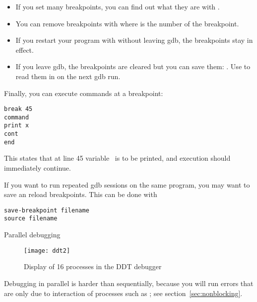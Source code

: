 \begin{itemize}
\item If you set many breakpoints, you can find out what they are with
  . 
\item You can remove breakpoints with  where  is the
  number of the breakpoint.
\item If you restart your program with  without leaving gdb,
  the breakpoints stay in effect.
\item If you leave gdb, the breakpoints are cleared but you can save
  them: . Use  to read
  them in on the next gdb run.
\end{itemize}

Finally, you can execute commands at a breakpoint:
\begin{verbatim}
break 45
command
print x
cont
end
\end{verbatim}
This states that at line 45 variable~ is to be printed, and execution
should immediately continue.

If you want to run repeated gdb sessions on the same program,
you may want to save an reload breakpoints. This can be done with
\begin{verbatim}
save-breakpoint filename
source filename
\end{verbatim}


 {Parallel debugging}

\begin{figure}[ht]
\texttt{[image: ddt2]}
\caption{Display of 16 processes in the DDT debugger}
\label{fig:ddt2}
\end{figure}

Debugging in parallel is harder than sequentially, because you will run
errors that are only due to interaction of processes such as ;
see section~\ref{sec:nonblocking}.

